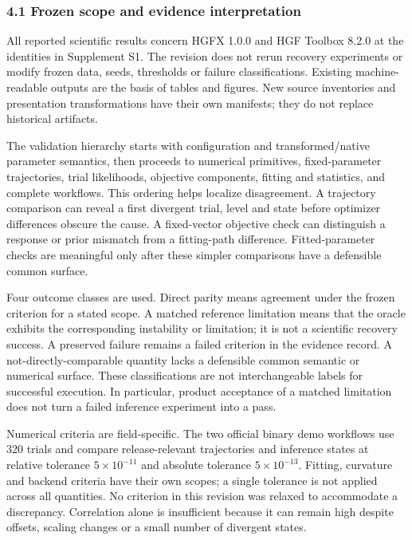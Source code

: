 \documentclass[
  11pt,
]{article}
\begin{document}
\subsubsection{4.1 Frozen scope and evidence
interpretation}\label{frozen-scope-and-evidence-interpretation}

All reported scientific results concern HGFX 1.0.0 and HGF Toolbox 8.2.0
at the identities in Supplement S1. The revision does not rerun recovery
experiments or modify frozen data, seeds, thresholds or failure
classifications. Existing machine-readable outputs are the basis of
tables and figures. New source inventories and presentation
transformations have their own manifests; they do not replace historical
artifacts.

The validation hierarchy starts with configuration and
transformed/native parameter semantics, then proceeds to numerical
primitives, fixed-parameter trajectories, trial likelihoods, objective
components, fitting and statistics, and complete workflows. This
ordering helps localize disagreement. A trajectory comparison can reveal
a first divergent trial, level and state before optimizer differences
obscure the cause. A fixed-vector objective check can distinguish a
response or prior mismatch from a fitting-path difference.
Fitted-parameter checks are meaningful only after these simpler
comparisons have a defensible common surface.

Four outcome classes are used. Direct parity means agreement under the
frozen criterion for a stated scope. A matched reference limitation
means that the oracle exhibits the corresponding instability or
limitation; it is not a scientific recovery success. A preserved failure
remains a failed criterion in the evidence record. A
not-directly-comparable quantity lacks a defensible common semantic or
numerical surface. These classifications are not interchangeable labels
for successful execution. In particular, product acceptance of a matched
limitation does not turn a failed inference experiment into a pass.

Numerical criteria are field-specific. The two official binary demo
workflows use 320 trials and compare release-relevant trajectories and
inference states at relative tolerance \(5\times10^{-11}\) and absolute
tolerance \(5\times10^{-13}\). Fitting, curvature and backend criteria
have their own scopes; a single tolerance is not applied across all
quantities. No criterion in this revision was relaxed to accommodate a
discrepancy. Correlation alone is insufficient because it can remain
high despite offsets, scaling changes or a small number of divergent
states.
\end{document}
